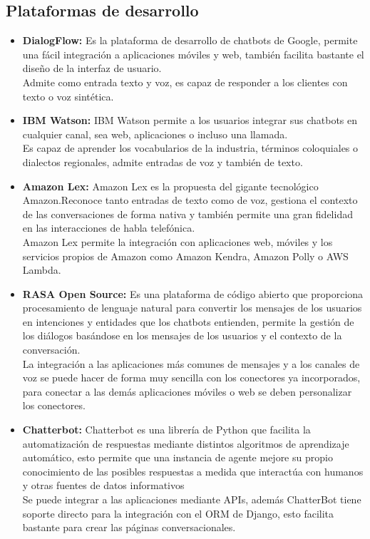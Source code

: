 \subsection{Plataformas de desarrollo}
\begin{itemize}
    \item \textbf{DialogFlow:}
        Es la plataforma de desarrollo de chatbots de Google, permite una fácil integración a aplicaciones móviles y web, también facilita bastante el diseño de la interfaz de usuario.\\
        Admite como entrada texto y voz, es capaz de responder a los clientes con texto o voz sintética.\\\cite{Dialogflow}
    \item \textbf{IBM Watson:}
        IBM Watson  permite a los usuarios integrar sus chatbots en cualquier canal, sea web, aplicaciones o incluso una llamada.\\
        Es capaz de aprender los vocabularios de la industria,  términos coloquiales o dialectos regionales, admite entradas de voz y también de texto. \\\cite{IBMCloud2020}
    \item \textbf{Amazon Lex:}
        Amazon Lex es la propuesta del gigante tecnológico Amazon.Reconoce tanto entradas de texto como de voz, gestiona el contexto de las conversaciones de forma nativa y también permite una gran fidelidad en las interacciones de habla telefónica.\\
        Amazon Lex permite la integración con aplicaciones web, móviles y los servicios propios de Amazon como Amazon Kendra, Amazon Polly o AWS Lambda.\\\cite{Amazon_Lex}
    \item \textbf{RASA Open Source:}
    Es una plataforma de código abierto que proporciona procesamiento de lenguaje natural para convertir los mensajes de los usuarios en intenciones y entidades que los chatbots entienden, permite la gestión de los diálogos basándose en los mensajes de los usuarios y el contexto de la conversación.\\
    La integración a las aplicaciones más comunes de mensajes y a los canales de voz se puede hacer de forma muy sencilla con los conectores ya incorporados, para conectar a las demás aplicaciones móviles o web se deben personalizar los conectores.\\\cite{Rasa}
    \item \textbf{Chatterbot:}
    Chatterbot es una librería de Python que facilita la automatización de respuestas mediante  distintos algoritmos de aprendizaje automático, esto permite que una instancia de agente mejore su propio conocimiento de las posibles respuestas a medida que interactúa con humanos y otras fuentes de datos informativos\\
    Se puede integrar a las aplicaciones mediante APIs, además ChatterBot tiene soporte directo para la integración con el ORM de Django, esto facilita bastante para crear las páginas conversacionales.\cite{Chatterbot}\\
\end{itemize}

